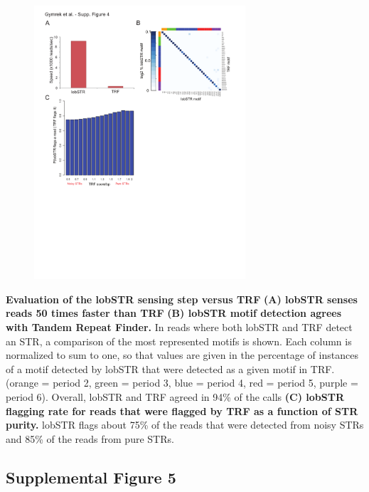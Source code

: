 \begin{figure}[h!]
\centering
\label{fig:lobsup4}
\includegraphics[width=0.7\textwidth]{Figures/Chapter2/SuppFig4.pdf}
\end{figure}
\textbf{Evaluation of the lobSTR sensing step versus TRF} \textbf{(A) lobSTR senses reads 50 times faster than TRF} \textbf{(B) lobSTR motif detection agrees with Tandem Repeat Finder.} In reads where both lobSTR and TRF detect an STR, a comparison of the most represented motifs is shown. Each column is normalized to sum to one, so that values are given in the percentage of instances of a motif detected by lobSTR that were detected as a given motif in TRF. (orange = period 2, green = period 3, blue = period 4, red = period 5, purple = period 6). Overall, lobSTR and TRF agreed in 94\% of the calls \textbf{(C) lobSTR flagging rate for reads that were flagged by TRF as a function of STR purity.} lobSTR flags about 75\% of the reads that were detected from noisy STRs and 85\% of the reads from pure STRs. 

\pagebreak
\subsection{Supplemental Figure 5}

